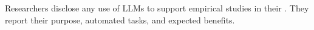 Researchers \must disclose any use of LLMs to support empirical studies in their \paper. They \should report their purpose, automated tasks, and expected benefits.